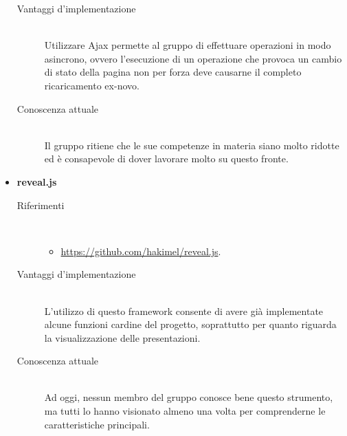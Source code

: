 \begin{itemize}
\begin{description}
		\item[Vantaggi d'implementazione]\ \\ 
		\noindent Utilizzare Ajax permette al gruppo di effettuare operazioni in modo asincrono, ovvero l'esecuzione di un operazione che provoca un cambio di stato della pagina non per forza deve causarne il completo ricaricamento ex-novo.
		
		\item[Conoscenza attuale]\ \\
		\noindent Il gruppo ritiene che le sue competenze in materia siano molto ridotte ed è consapevole di dover lavorare molto su questo fronte.
	\end{description}
	
	\item \textbf{\gls{reveal.js}}
	\begin{description}
		\item[Riferimenti]\ 
		\noindent\begin{itemize}
			\item \url{https://github.com/hakimel/reveal.js}.
		\end{itemize}
		
		\item[Vantaggi d'implementazione]\ \\ 
		\noindent L'utilizzo di questo \gls{framework} consente di avere già implementate alcune funzioni cardine del progetto, soprattutto per quanto riguarda la visualizzazione delle presentazioni.
		
		\item[Conoscenza attuale]\ \\
		\noindent Ad oggi, nessun membro del gruppo conosce bene questo strumento, ma tutti lo hanno visionato almeno una volta per comprenderne le caratteristiche principali.
	\end{description}
\end{itemize}

